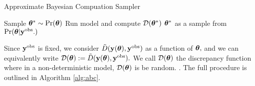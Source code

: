 \begin{algorithm}[htbp]
    \caption{Approximate Bayesian Compuation Sampler}
    \label{alg:abc}
    \begin{algorithmic}[1]
        \State Sample $\bm{\theta}^\ast \sim \Pr(\bm{\theta})$
        \State Run model and compute $\mathcal{D}(\bm{\theta}^\ast)$
        \State \Return $\bm{\theta}^\ast$ as a sample from $\Pr(\bm{\theta}|\mathbf{y}^{\mathrm{obs}}.)$
        \EndIf
    \end{algorithmic}
\end{algorithm}

Since $\mathbf{y}^{\mathrm{obs}}$ is fixed, we consider $\tilde{D}(\mathbf{y}(\bm{\theta}), \mathbf{y}^{\mathrm{obs}})$ as a
function of $\bm{\theta},$ and
we can equivalently write $\mathcal{D}(\bm{\theta}) := \tilde{D}(\mathbf{y}(\bm{\theta}), \mathbf{y}^{\mathrm{obs}}).$
We call $\mathcal{D}(\bm{\theta})$ the discrepancy function where in a
non-deterministic model, $\mathcal{D}(\bm{\theta})$ is be random.
. The full procedure is outlined in Algorithm \ref{alg:abc}.